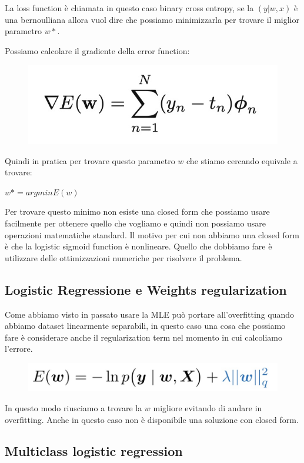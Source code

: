 \documentclass[14pt]{extreport}
\begin{document}
La loss function è chiamata in questo caso binary cross entropy, se la $(y|w,x)$ è una bernoulliana allora vuol dire che possiamo minimizzarla per
trovare il miglior parametro $w*$.

Possiamo calcolare il gradiente della error function:

\begin{figure}[H]
	\centering
	\includegraphics[width=0.7\linewidth]{212.jpeg}
\end{figure}

Quindi in pratica per trovare questo parametro $w$ che stiamo cercando equivale a trovare:

$w* = argmin E(w)$

Per trovare questo minimo non esiste una closed form che possiamo usare facilmente per ottenere quello che vogliamo e quindi non possiamo usare
operazioni matematiche standard. Il motivo per cui non abbiamo una closed form è che la logistic sigmoid function è nonlineare. Quello che dobbiamo
fare è utilizzare delle ottimizzazioni numeriche per risolvere il problema.

\subsection{Logistic Regressione e Weights regularization}

Come abbiamo visto in passato usare la MLE può portare all'overfitting quando abbiamo dataset linearmente separabili, in questo caso una cosa che
possiamo fare è considerare anche il regularization term nel momento in cui calcoliamo l'errore.


\begin{figure}[H]
	\centering
	\includegraphics[width=0.5\linewidth]{193.jpeg}
\end{figure}

In questo modo riusciamo a trovare la $w$ migliore evitando di andare in overfitting. Anche in questo caso non è disponibile una soluzione con closed
form.

\subsection{Multiclass logistic regression}
\end{document}

